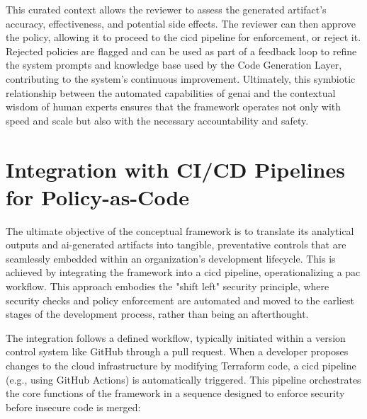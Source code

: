 This curated context allows the reviewer to assess the generated artifact's accuracy, effectiveness, and potential side effects. The reviewer can then approve the policy, allowing it to proceed to the \gls{cicd} pipeline for enforcement, or reject it. Rejected policies are flagged and can be used as part of a feedback loop to refine the system prompts and knowledge base used by the Code Generation Layer, contributing to the system's continuous improvement\cite{zanzotto_human---loop_2019, wu_survey_2022}. Ultimately, this symbiotic relationship between the automated capabilities of \gls{genai} and the contextual wisdom of human experts ensures that the framework operates not only with speed and scale but also with the necessary accountability and safety.


\section{Integration with CI/CD Pipelines for Policy-as-Code} %
\label{sec:Integration with CI/CD Pipelines for Policy-as-Code}

The ultimate objective of the conceptual framework is to translate its analytical outputs and \gls{ai}-generated artifacts into tangible, preventative controls that are seamlessly embedded within an organization's development lifecycle. This is achieved by integrating the framework into a \gls{cicd} pipeline, operationalizing a \gls{pac} workflow. This approach embodies the "shift left" security principle, where security checks and policy enforcement are automated and moved to the earliest stages of the development process, rather than being an afterthought.

The integration follows a defined workflow, typically initiated within a version control system like GitHub through a pull request. When a developer proposes changes to the cloud infrastructure by modifying Terraform code, a \gls{cicd} pipeline (e.g., using GitHub Actions) is automatically triggered. This pipeline orchestrates the core functions of the framework in a sequence designed to enforce security before insecure code is merged:

